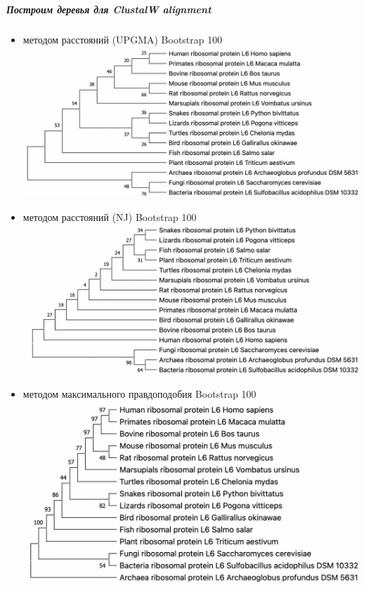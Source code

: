 \documentclass[12pt]{article}
\begin{document}
\subparagraph{Построим деревья для ClustalW alignment}
\begin{itemize}
    \itemsep0em
    \item методом расстояний (UPGMA) Bootstrap 100\\
    \includegraphics[width=\textwidth]{images/image6.png}\\
    \newpage
    \item методом расстояний (NJ) Bootstrap 100\\
    \includegraphics[width=\textwidth]{images/image7.png}\\
    \item методом максимального правдоподобия Bootstrap 100\\
    \includegraphics[width=\textwidth]{images/image8.png}\\
\end{itemize}
\newpage
\end{document}
